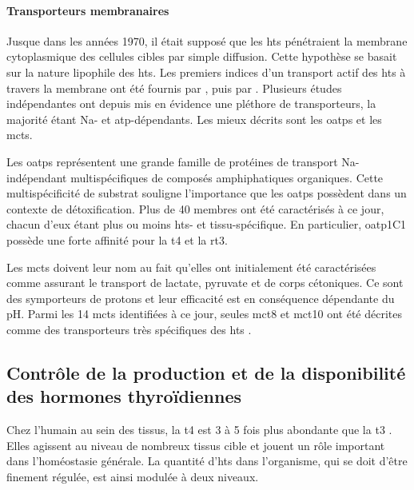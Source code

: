 \documentclass[../main.tex]{subfiles}
\begin{document}
\paragraph{Transporteurs membranaires}
Jusque dans les années 1970, il était supposé que les \glspl{ht} pénétraient la membrane cytoplasmique des cellules cibles par simple diffusion. Cette hypothèse se basait sur la nature lipophile des \glspl{ht}.
Les premiers indices d'un transport actif des \glspl{ht} à travers la membrane ont été fournis par \citet{Christensen1954}, puis par \citet{Rao1976}. Plusieurs études indépendantes ont depuis mis en évidence une pléthore de transporteurs, la majorité étant \gls{Na}- et \gls{atp}-dépendants. Les mieux décrits sont les \glspl{oatp} et les \glspl{mct}.

Les \glspl{oatp} représentent une grande famille de protéines de transport \gls{Na}-indépendant multispécifiques de composés amphiphatiques organiques.
Cette multispécificité de substrat souligne l'importance que les \glspl{oatp} possèdent dans un contexte de détoxification.
Plus de 40 membres ont été caractérisés à ce jour, chacun d'eux étant plus ou moins \glspl{ht}- et tissu-spécifique.
En particulier, \gls{oatp}1C1 possède une forte affinité pour la \gls{t4} et la \gls{rt3}.

Les \glspl{mct} doivent leur nom au fait qu'elles ont initialement été caractérisées comme assurant le transport de lactate, pyruvate et de corps cétoniques.
Ce sont des symporteurs de protons et leur efficacité est en conséquence dépendante du pH.
Parmi les 14 \glspl{mct} identifiées à ce jour, seules \gls{mct}8 et \gls{mct}10 ont été décrites comme des transporteurs très spécifiques des \glspl{ht} \citep{Friesema2003,Friesema2008}.


\subsection{Contrôle de la production et de la disponibilité des hormones thyroïdiennes}
Chez l'humain au sein des tissus, la \gls{t4} est 3 à 5 fois plus abondante que la \gls{t3} \citep{Laurberg1984}. Elles agissent au niveau de nombreux tissus cible et jouent un rôle important dans l'homéostasie générale.
La quantité d'\glspl{ht} dans l'organisme, qui se doit d'être finement régulée, est ainsi modulée à deux niveaux.
\end{document}
